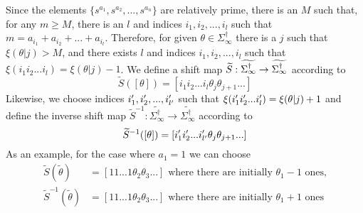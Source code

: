 \documentclass{amsproc}
\theoremstyle{plain}
\theoremstyle{definition}
\numberwithin{equation}{section}
\begin{document}
Since the elements $\{s^{a_{1}},s^{a_{2}},...,s^{a_{n}}\}$ are relatively
prime, there is an $M$ such that, for any $m\geq M$, there is an $l$ and
indices $i_{1},i_{2},...,i_{l}$ such that $%
m=a_{i_{1}}+a_{i_{2}}+...+a_{i_{l}}$. Therefore, for given $%
\theta\in\Sigma_{\infty}^{\dag}$ there is a $j$ such that $\xi(\theta|j)>M$,
and there exists $l$ and indices $i_{1},i_{2},...,i_{l}$ such that $%
\xi(i_{1}i_{2}...i_{l})=\xi(\theta|j)-1$. We define a shift map $\widetilde{S%
}:\widetilde{\Sigma_{\infty}^{\dag}}\rightarrow \widetilde{%
\Sigma_{\infty}^{\dag}}$ according to%
\begin{equation*}
\widetilde{S}(\left[ \theta\right] )=\left[ i_{1}i_{2}...i_{l}\theta
_{j}\theta_{j+1}...\right]
\end{equation*}
Likewise, we choose indices $i_{1}^{\prime},i_{2}^{\prime},...,i_{l^{%
\prime}}^{\prime}$ such that $\xi(i_{1}^{\prime}i_{2}^{\prime}...i_{l}^{%
\prime})=\xi(\theta|j)+1$ and define the inverse shift map $\widetilde{S}%
^{-1}:\widetilde{\Sigma_{\infty}^{\dag}}\rightarrow\widetilde{\Sigma_{\infty
}^{\dag}}$ according to 
\begin{equation*}
\widetilde{S}^{-1}(\left[ \theta\right] )=\left[ i_{1}^{\prime}i_{2}^{%
\prime}...i_{l^{\prime}}^{\prime}\theta_{j}\theta_{j+1}...\right]
\end{equation*}
As an example, for the case where $a_{1}=1$ we can choose 
\begin{align*}
\widetilde{S}(\widetilde{\theta}) & =\left[ 11...1\theta_{2}\theta _{3}...%
\right] \text{ where there are initially }\theta_{1}-1\text{ ones,} \\
\widetilde{S}^{-1}(\widetilde{\theta}) & =\left[ 11...1\theta_{2}\theta
_{3}...\right] \text{ where there are initially }\theta_{1}+1\text{ ones}
\end{align*}
\end{document}
